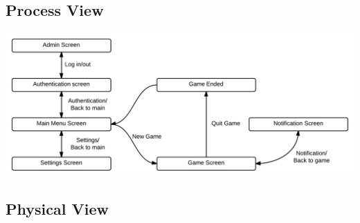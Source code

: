 \subsection{Process View}
\begin{center}
\includegraphics[clip=true, width=0.9 \textwidth]{assets/ProcessView.png}
\label{ref:gantt}
\end{center}
\subsection{Physical View}

